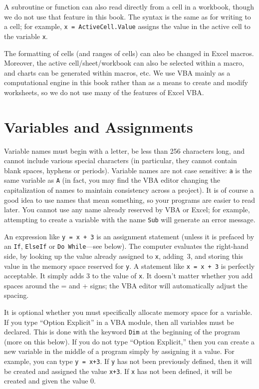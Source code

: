 A subroutine or function can also read directly from a cell in a workbook, though we do not use that feature in this book.  The syntax is the same as for writing to a cell; for example, \verb!x = ActiveCell.Value! assigns the value in the active cell to the variable \verb!x!.

The formatting of cells (and ranges of cells) can also be changed in Excel macros.  Moreover, the active cell/sheet/workbook can also be selected within a macro, and charts can be generated within macros, etc.  We use VBA mainly as a computational engine in this book rather than as a means to create and modify worksheets, so we do not use many of the features of Excel VBA.

\section{Variables and Assignments}

Variable names must begin with a letter, be less than 256 characters long, and cannot include various special characters (in particular, they cannot contain blank spaces, hyphens or periods).  Variable names are not case sensitive: \verb!a! is the same variable as \verb!A! (in fact, you may find the VBA editor changing the capitalization of names to maintain consistency across a project).  It is of course a good idea to use names that mean something, so your programs are easier to read later.  You cannot use any name already reserved by VBA or Excel; for example, attempting to create a variable with the name \verb!Sub! will generate an error message.
 
An expression like \verb!y = x + 3! is an assignment statement (unless it is prefaced by an \verb!If!, \verb!ElseIf! or \verb!Do While!---see below).  The computer evaluates the right-hand side, by looking up the value already assigned to \verb!x!, adding~3, and storing this value in the memory space reserved for \verb!y!.  A statement like \verb!x = x + 3! is perfectly acceptable.  It simply adds 3 to the value of \verb!x!.  It doesn't matter whether you add spaces around the = and + signs; the VBA editor will automatically adjust the spacing.

It is optional whether you must specifically allocate memory space for a variable.  If you type ``Option Explicit'' in a VBA module, then all variables must be declared.  This is done with the keyword \verb!Dim! at the beginning of the program (more on this below).  If you do not type ``Option Explicit,'' then you can create a new variable in the middle of a program simply by assigning it a value.  For example, you can type \verb!y = x+3!.  If \verb!y! has not been previously defined, then it will be created and assigned the value \verb!x+3!.  If \verb!x! has not been defined, it will be created and given the value 0.  


